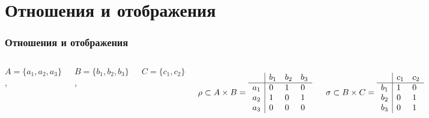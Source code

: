 \documentclass[24pt,pdf,hyperref={unicode},aspectratio=169]{beamer}
\begin{document}
\section{Отношения и отображения}

\begin{frame}\frametitle{Отношения и отображения}
\begin{columns}
$
A=\{a_1,a_2, a_3\}$, 

$B=\{b_1,b_2,b_3\}$, 

$C=\{c_1,c_2\}$

$$
\rho\subset A \times B=
\begin{array}{l|l l l}
    & b_1 & b_2 & b_3 \\
\hline
a_1 &  0  &  1 & 0 \\
a_2 &  1  &  0 & 1 \\
a_3 &  0  &  0 & 0 \\
\end{array}
$$

$$
\sigma\subset B \times C =
\begin{array}{l|l l l}
    & c_1 & c_2 \\
\hline
b_1 &  1  &  0 \\
b_2 &  0  &  1 \\
b_3 &  0  &  1 \\
\end{array}
$$



\end{columns}
\end{frame}
\end{document}
